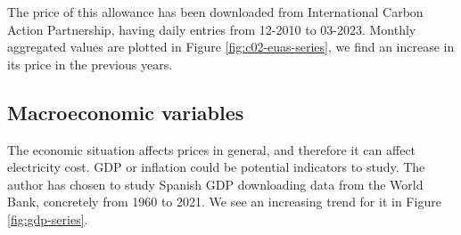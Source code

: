 The price of this allowance has been downloaded from International Carbon Action Partnership, having daily entries from 12-2010 to 03-2023. Monthly aggregated values are plotted in Figure \ref{fig:c02-euas-series}, we find an increase in its price in the previous years.

\subsection{Macroeconomic variables}
The economic situation affects prices in general, and therefore it can affect electricity cost.
GDP or inflation could be potential indicators to study. The author has chosen to study Spanish GDP downloading data from the World Bank, concretely from 1960 to 2021. We see an increasing trend for it in Figure \ref{fig:gdp-series}.

